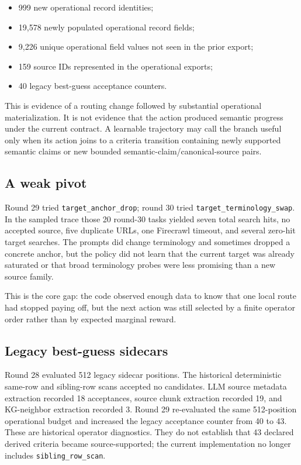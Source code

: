 \documentclass[11pt]{article}
\newcommand{\action}[1]{\texttt{#1}}
\begin{document}
\begin{itemize}
  \item 999 new operational record identities;
  \item 19,578 newly populated operational record fields;
  \item 9,226 unique operational field values not seen in the prior export;
  \item 159 source IDs represented in the operational exports;
  \item 40 legacy best-guess acceptance counters.
\end{itemize}

This is evidence of a routing change followed by substantial operational
materialization.  It is not evidence that the action produced semantic progress
under the current contract.  A learnable trajectory may call the branch useful
only when its action joins to a criteria transition containing newly supported
semantic claims or new bounded semantic-claim/canonical-source pairs.

\subsection{A weak pivot}

Round 29 tried \action{target\_anchor\_drop}; round 30 tried
\action{target\_terminology\_swap}.  In the sampled trace those 20 round-30
tasks yielded seven total search hits, no accepted source, five duplicate URLs,
one Firecrawl timeout, and several zero-hit target searches.  The prompts did
change terminology and sometimes dropped a concrete anchor, but the policy did
not learn that the current target was already saturated or that broad
terminology probes were less promising than a new source family.

This is the core gap: the code observed enough data to know that one local
route had stopped paying off, but the next action was still selected by a
finite operator order rather than by expected marginal reward.

\subsection{Legacy best-guess sidecars}

Round 28 evaluated 512 legacy sidecar positions.  The historical deterministic
same-row and sibling-row scans accepted no candidates.  LLM source metadata
extraction recorded 18 acceptances, source chunk extraction recorded 19, and
KG-neighbor extraction recorded 3.  Round 29 re-evaluated the same 512-position
operational budget and increased the legacy acceptance counter from 40 to 43.
These are historical operator diagnostics.  They do not establish that 43
declared derived criteria became source-supported; the current implementation
no longer includes \action{sibling\_row\_scan}.
\end{document}
